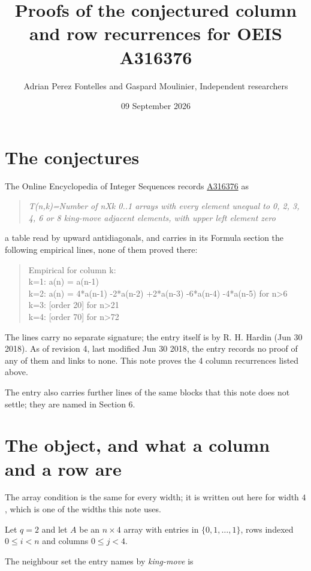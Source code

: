 \documentclass[11pt]{article}
\title{Proofs of the conjectured column and row recurrences for OEIS A316376}
\author{Adrian Perez Fontelles and Gaspard Moulinier, Independent researchers}
\date{09 September 2026}
\theoremstyle{definition}
\begin{document}
\maketitle
\section{The conjectures}

The Online Encyclopedia of Integer Sequences records \href{https://oeis.org/A316376}{A316376} as

\begin{quote}\itshape T(n,k)=Number of nXk 0..1 arrays with every element unequal to 0, 2, 3, 4, 6 or 8 king-move adjacent elements, with upper left element zero\end{quote}

a table read by upward antidiagonals, and carries in its Formula section the following empirical lines, none of them proved there:

\begin{quote}\ttfamily Empirical for column k:\\
k=1: a(n) = a(n-1)\\k=2: a(n) = 4*a(n-1) -2*a(n-2) +2*a(n-3) -6*a(n-4) -4*a(n-5) for n>6\\k=3: [order 20] for n>21\\k=4: [order 70] for n>72\end{quote}

The lines carry no separate signature; the entry itself is by R. H. Hardin (Jun 30 2018). As of revision 4, last modified Jun 30 2018, the entry records no proof of any of them and links to none. This note proves the 4 column recurrences listed above.

The entry also carries further lines of the same blocks that this note does not settle; they are named in Section 6.

\section{The object, and what a column and a row are}

The array condition is the same for every width; it is written out here for width $4$, which is one of the widths this note uses.

Let $q = 2$ and let $A$ be an $n \times 4$ array with entries in $\{0,1,\dots,1\}$, rows indexed $0 \le i < n$ and columns $0 \le j < 4$.

The neighbour set the entry names by {\itshape king-move} is
\end{document}
